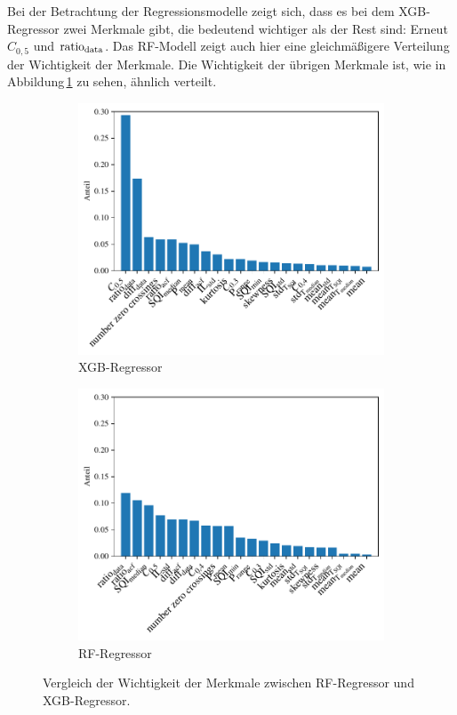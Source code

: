 Bei der Betrachtung der Regressionsmodelle zeigt sich, dass es bei dem \ac{XGB}-Regressor zwei Merkmale gibt, die bedeutend wichtiger als der Rest sind: Erneut $C_{0,5}$ und $\text{ratio}\textsubscript{data}$. Das \ac{RF}-Modell zeigt auch hier eine gleichmäßigere Verteilung der Wichtigkeit der Merkmale. Die Wichtigkeit der übrigen Merkmale ist, wie in Abbildung\,\ref{fig:importances-comparison-rf-xgb-regr} zu sehen, ähnlich verteilt.

 \begin{figure}[h]
 	\centering
		\begin{subfigure}{.49\textwidth}
			\centering
 			\includegraphics[width=\textwidth]{pic/xgb-regr-final-importances.pdf}
 			\caption{\ac{XGB}-Regressor}
 		\end{subfigure}
    	\begin{subfigure}{.49\textwidth}
    		\centering
 			\includegraphics[width=\textwidth]{pic/rf-regr-final-importances.pdf}
 			\caption{\ac{RF}-Regressor}
 		\end{subfigure}
 	\caption{Vergleich der Wichtigkeit der Merkmale zwischen \ac{RF}-Regressor und \ac{XGB}-Regressor.}
 	\label{fig:importances-comparison-rf-xgb-regr}
 \end{figure}
 
